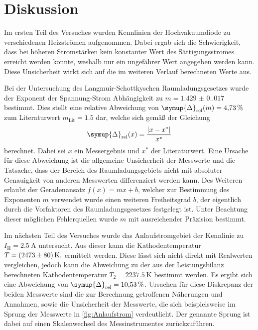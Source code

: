 \section{Diskussion}
\label{sec:Diskussion}
Im ersten Teil des Versuches wurden Kennlinien der Hochvakuumdiode zu verschiedenen Heizströmen aufgenommen. Dabei ergab sich die Schwierigkeit, dass bei höheren
Stromstärken kein konstanter Wert des Sättigungsstromes erreicht werden konnte, weshalb nur ein ungefährer Wert angegeben werden kann. Diese Unsicherheit wirkt 
sich auf die im weiteren Verlauf berechneten Werte aus. 

Bei der Untersuchung des Langmuir-Schottkyschen Raumladungsgesetzes wurde der Exponent der Spannung-Strom Abhängigkeit zu $m = \num{1.429(0.017)}$ bestimmt.
Dies stellt eine relative Abweichung von $\symup{\Delta}_\text{rel}(m) = \qty{4.73}{\percent}$ zum Literaturwert $m_\text{Lit} = 1.5$ dar, welche sich gemäß
der Gleichung
\begin{equation*}
    \symup{\Delta}_\text{rel}(x) = \frac{|x - x^*|}{x^*}
\end{equation*}
berechnet. Dabei sei $x$ ein Messergebnis und $x^*$ der Literaturwert. Eine Ursache für diese Abweichung ist die allgemeine Unsicherheit der Messwerte und die
Tatsache, dass der Bereich des Raumladungsgebiets nicht mit absoluter Genauigkeit von anderen Messwerten differenziert werden kann. Des Weiteren erlaubt der 
Geradenansatz $f(x) = mx + b$, welcher zur Bestimmung des Exponenten $m$ verwendet wurde einen weiteren Freiheitsgrad $b$, der eigentlich durch die Vorfaktoren
des Raumladungsgesetzes festgelegt ist. Unter Beachtung dieser möglichen Fehlerquellen wurde $m$ mit ausreichender Präzision bestimmt.

Im nächsten Teil des Versuches wurde das Anlaufstromgebiet der Kennlinie zu $I_\text{H} = \qty{2.5}{\ampere}$ untersucht. Aus dieser kann die Kathodentemperatur
$T = \qty{2473+-80}{\kelvin}.$ ermittelt werden. Diese lässt sich nicht direkt mit Realwerten vergleichen, jedoch kann die Abweichung zu der aus der Leistungsbilanz
berechneten Kathodentemperatur $T_2 = \qty{2237.5}{\kelvin}$ bestimmt werden. Es ergibt sich eine Abweichung von $\symup{\Delta}_\text{rel} = \qty{10.53}{\percent}$.
Ursachen für diese Diskrepanz der beiden Messwerte sind die zur Berechnung getroffenen Näherungen und Annahmen, sowie die Unsicherheit der Messwerte, die sich
beispielsweise im Sprung der Messwerte in \autoref{fig:Anlaufstrom} verdeutlicht. Der genannte Sprung ist dabei auf einen Skalenwechsel des Messinstrumentes 
zurückzuführen.

